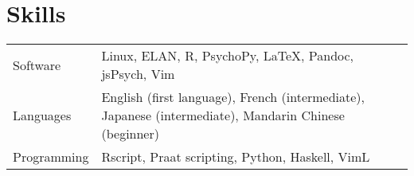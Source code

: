\documentclass[letterpaper]{article}
\begin{document}
\section*{Skills}
\begin{tabular}{p{}p{}}
    Software &Linux, ELAN, R, PsychoPy, \LaTeX{}, Pandoc, jsPsych, Vim \\
    Languages &English (first language), French (intermediate), Japanese (intermediate),
    Mandarin Chinese (beginner)
    \\
    Programming & Rscript, Praat scripting, Python, Haskell, VimL \\
\end{tabular}

\vfill


\end{document}
